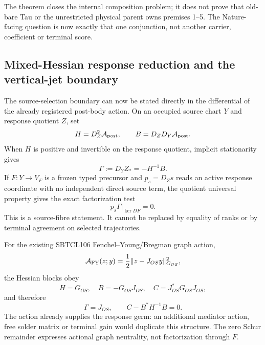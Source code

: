 \documentclass[11pt,a4paper]{article}
\theoremstyle{remark}
\begin{document}
The theorem closes the internal composition problem; it does not prove that
old-bare Tau or the unrestricted physical parent owns premises 1--5.  The
Nature-facing question is now exactly that one conjunction, not another
carrier, coefficient or terminal score.

\subsection{Mixed-Hessian response reduction and the vertical-jet boundary}

The source-selection boundary can now be stated directly in the differential
of the already registered post-body action.  On an occupied source chart $Y$
and response quotient $Z$, set
\begin{equation}
 H=D_Z^2\mathcal A_{\rm post},\qquad
 B=D_ZD_Y\mathcal A_{\rm post}.
 \label{eq:td0-mixed-hessian-blocks}
\end{equation}
When $H$ is positive and invertible on the response quotient, implicit
stationarity gives
\begin{equation}
 \boxed{\Gamma:=D_YZ_*=-H^{-1}B.}
 \label{eq:td0-mixed-hessian-response}
\end{equation}
If $F:Y\to V_F$ is a frozen typed precursor and $p_s=D_Zs$ reads an active
response coordinate with no independent direct source term, the quotient
universal property gives the exact factorization test
\begin{equation}
 \boxed{p_s\Gamma\vert_{\ker DF}=0.}
 \label{eq:td0-active-factorization}
\end{equation}
This is a source-fibre statement. It cannot be replaced by equality of ranks
or by terminal agreement on selected trajectories.

For the existing SBTCL106 Fenchel--Young/Bregman graph action,
\begin{equation}
 \mathcal A_{\rm FY}(z;y)
 =\frac12\lVert z-J_{OS}y\rVert_{G_{OS}}^2,
\end{equation}
the Hessian blocks obey
\begin{equation}
 H=G_{OS},\quad B=-G_{OS}J_{OS},\quad
 C=J_{OS}^*G_{OS}J_{OS},
\end{equation}
and therefore
\begin{equation}
 \boxed{\Gamma=J_{OS},\qquad C-B^*H^{-1}B=0.}
 \label{eq:td0-sbtcl-response}
\end{equation}
The action already supplies the response germ: an additional mediator action,
free solder matrix or terminal gain would duplicate this structure.  The zero
Schur remainder expresses actional graph neutrality, not factorization through
$F$.
\end{document}
